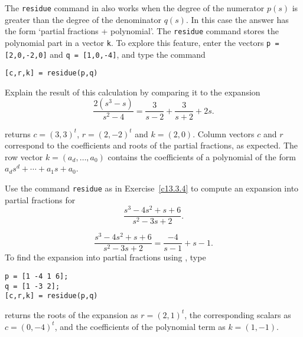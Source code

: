 \documentclass{ximera}
\begin{document}
\begin{exercise} \label{c13.3.4}
The {\tt residue} command in \Matlab also works when the degree of the
numerator $p(s)$ is greater than the degree of the denominator $q(s)$.
In this case the answer has the form `partial fractions + polynomial'.
The {\tt residue} command stores the polynomial part in a vector {\tt k}.
To explore this feature, enter the vectors {\tt p = [2,0,-2,0]} and
{\tt q = [1,0,-4]}, and type the command
\begin{verbatim}
[c,r,k] = residue(p,q)
\end{verbatim}
Explain the result of this calculation by comparing it to the expansion
\[
\frac{2(s^3-s)}{s^2-4} = \frac{3}{s-2} + \frac{3}{s+2} +2s.
\]

\begin{solution}

\Matlab returns $c = (3,3)^t$, $r = (2,-2)^t$ and $k = (2,0)$.
Column vectors $c$ and $r$ correspond to the coefficients and roots of
the partial fractions, as expected.  The row vector $k =
(a_d,\dots,a_0)$ contains the coefficients of a polynomial of the form
$a_ds^d + \cdots + a_1s + a_0$.

\end{solution}
\end{exercise}

\begin{exercise} \label{c13.3.4b}
Use the command {\tt residue} as in Exercise~\ref{c13.3.4} to compute an 
expansion into partial fractions for
\[
\frac{s^3-4s^2+s+6}{s^2-3s+2}.
\]

\begin{solution}

\ans
\[
\frac{s^3 - 4s^2 + s + 6}{s^2 - 3s + 2}
= \frac{-4}{s - 1} + s - 1.
\]
\soln To find the expansion into partial fractions using \Matlabp, type
\begin{verbatim}
p = [1 -4 1 6];
q = [1 -3 2];
[c,r,k] = residue(p,q)
\end{verbatim}
\Matlab returns the roots of the expansion as $r = (2,1)^t$, the
corresponding scalars as $c = (0,-4)^t$, and the coefficients of the
polynomial term as $k = (1,-1)$.




\end{solution}
\end{exercise}
\end{document}
